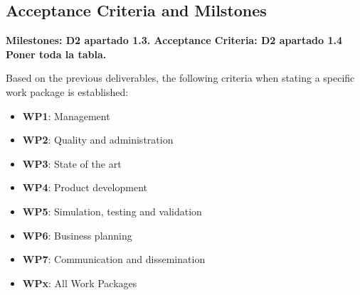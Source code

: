 \subsection{Acceptance Criteria and Milstones}

\textbf{Milestones: D2 apartado 1.3. Acceptance Criteria: D2 apartado 1.4 Poner toda la tabla.}

Based on the previous deliverables, the following criteria when stating a specific work package is established:
\begin{itemize} 	
	\item \textbf{WP1}: Management 
	\item \textbf{WP2}: Quality and administration
	\item \textbf{WP3}: State of the art
	\item \textbf{WP4}: Product development
	\item \textbf{WP5}: Simulation, testing and validation
	\item \textbf{WP6}: Business planning
	\item \textbf{WP7}: Communication and dissemination
	\item \textbf{WPx}: All Work Packages
\end{itemize}
	

